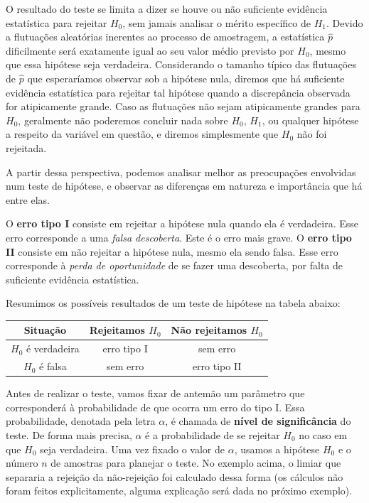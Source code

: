 \documentclass[12pt,a4paper]{article}
\theoremstyle{plain}
\theoremstyle{definition}
\theoremstyle{remark}
\begin{document}
O resultado do teste se limita a dizer se houve ou não suficiente evidência estatística para rejeitar $H_0$, sem jamais analisar o mérito específico de $H_1$.
Devido a flutuações aleatórias inerentes ao processo de amostragem, a estatística $\hat{p}$ dificilmente será exatamente igual ao seu valor médio previsto por $H_0$, mesmo que essa hipótese seja verdadeira.
Considerando o tamanho típico das flutuações de $\hat{p}$ que esperaríamos observar sob a hipótese nula, diremos que há suficiente evidência estatística para rejeitar tal hipótese quando a discrepância observada for atipicamente grande.
Caso as flutuações não sejam atipicamente grandes para $H_0$, geralmente não poderemos concluir nada sobre $H_0$, $H_1$, ou qualquer hipótese a respeito da variável em questão, e diremos simplesmente que $H_0$ não foi rejeitada.

A partir dessa perspectiva, podemos analisar melhor as preocupações envolvidas num teste de hipótese, e observar as diferenças em natureza e importância que há entre elas.

O \textbf{erro tipo I} consiste em rejeitar a hipótese nula quando ela é verdadeira. Esse erro corresponde a uma \emph{falsa descoberta}. Este é o erro mais grave.
O \textbf{erro tipo II} consiste em não rejeitar a hipótese nula, mesmo ela sendo falsa. Esse erro corresponde à \emph{perda de oportunidade} de se fazer uma descoberta, por falta de suficiente evidência estatística.

Resumimos os possíveis resultados de um teste de hipótese na tabela abaixo:
\begin{table}[H]
\centering
\begin{tabular}{||c|c|c||}
\hline
\hline
Situação & Rejeitamos $H_0$ & Não rejeitamos $H_0$
\\
\hline
$H_0$ é verdadeira & erro tipo I & sem erro
\\
\hline
$H_0$ é falsa & sem erro & erro tipo II
\\
\hline
\hline
\end{tabular}
\end{table}

Antes de realizar o teste, vamos fixar de antemão um parâmetro que corresponderá à probabilidade de que ocorra um erro do tipo I.
Essa probabilidade, denotada pela letra $\alpha$, é chamada de \textbf{nível de significância} do teste.
De forma mais precisa, $\alpha$ é a probabilidade de se rejeitar $H_0$ no caso em que $H_0$ seja verdadeira.
Uma vez fixado o valor de $\alpha$, usamos a hipótese $H_0$ e o número $n$ de amostras para planejar o teste. No exemplo acima, o limiar que separaria a rejeição da não-rejeição foi calculado dessa forma (os cálculos não foram feitos explicitamente, alguma explicação será dada no próximo exemplo).
\end{document}
